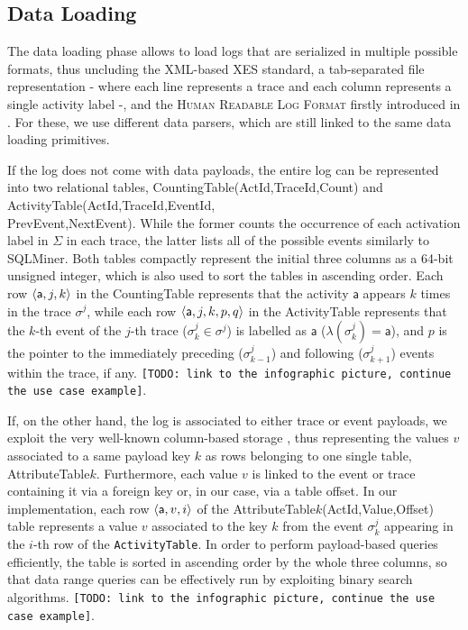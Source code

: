 \subsection{Data Loading}\label{ssec:dl}
The data loading phase allows to load logs that are serialized in multiple possible formats, thus uncluding the XML-based XES standard, a tab-separated file representation - where each line represents a trace and each column represents a single activity label -, and the \textsc{Human Readable Log Format} firstly introduced in \cite{bpm21}. For these, we use different data parsers, which are still linked to the same data loading primitives. 

If the log does not come with data payloads, the entire log can be represented into two relational tables, \textsf{CountingTable(ActId,TraceId,Count)} and \textsf{ActivityTable(ActId,TraceId,EventId,\\PrevEvent,NextEvent)}. While the former counts the occurrence of each activation label in $\Sigma$ in each trace, the latter lists all of the possible events similarly to SQLMiner. Both tables compactly represent the initial three columns as a 64-bit unsigned integer, which is also used to sort the tables in ascending order. Each row $\braket{\textsf{a},j,k}$ in the \textsf{CountingTable} represents that the activity $\textsf{a}$ appears $k$ times in the trace $\sigma^j$, while each row $\braket{\textsf{a},j,k,p,q}$ in the \textsf{ActivityTable} represents that the $k$-th event of the $j$-th trace ($\sigma^j_k\in \sigma^j$) is labelled as $\textsf{a}$ ($\lambda(\sigma^j_k)=\textsf{a}$), and $p$ is the pointer to the immediately preceding ($\sigma^j_{k-1}$) and following ($\sigma^j_{k+1}$) events within the trace, if any.  \texttt{\color{red}[TODO: link to the infographic picture, continue the use case example]}. 

If, on the other hand, the log is associated to either trace or event payloads, we exploit the very well-known column-based storage \cite{IdreosGNMMK12}, thus representing the values $v$ associated to a same payload key $k$ as rows belonging to one single table,  \textsf{AttributeTable$k$}. Furthermore, each value $v$ is linked to the event or trace containing it via a foreign key or, in our case, via a table offset. In our implementation, each row $\braket{\textsf{a},v,i}$ of the  \textsf{AttributeTable$k$(ActId,Value,Offset)} table represents a value $v$ associated to the key $k$ from the event $\sigma^j_k$ appearing in the $i$-th row of the \texttt{ActivityTable}. In order to perform payload-based queries efficiently, the table is sorted in ascending order by the whole three columns, so that data range queries can be effectively run by exploiting binary search algorithms. \texttt{\color{red}[TODO: link to the infographic picture, continue the use case example]}. 

